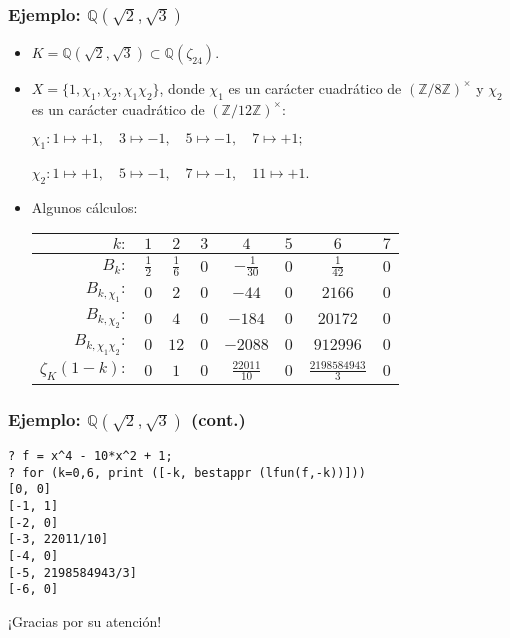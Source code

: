 \documentclass[handout]{beamer}
\newcommand{\ZZ}{\mathbb{Z}}
\newcommand{\QQ}{\mathbb{Q}}
\begin{document}

\begin{frame}
  \frametitle{Ejemplo: $\QQ (\sqrt{2},\sqrt{3})$}

  \begin{itemize}
  \item<1-> $K = \QQ (\sqrt{2},\sqrt{3}) \subset \QQ (\zeta_{24})$.

  \item<2-> $X = \{ 1, \chi_1, \chi_2, \chi_1\chi_2 \}$, donde $\chi_1$ es un carácter
    cuadrático de $(\ZZ/8\ZZ)^\times$ y $\chi_2$ es un carácter cuadrático de
    $(\ZZ/12\ZZ)^\times$:

    $\chi_1\colon 1 \mapsto +1, \quad
    3\mapsto -1, \quad
    5\mapsto -1, \quad
    7\mapsto +1;$

    $\chi_2\colon 1 \mapsto +1, \quad
    5\mapsto -1, \quad
    7\mapsto -1, \quad
    11\mapsto +1$.

  \item<3-> Algunos cálculos:

    \begin{center}\small
      \renewcommand{\arraystretch}{1.5}
    \begin{tabular}{rccccccc}
      \hline
      $k\colon$ & $1$ & $2$ & $3$ & $4$ & $5$ & $6$ & $7$ \\
      \hline
      $B_k\colon$ & $\frac{1}{2}$ & $\frac{1}{6}$ & $0$ & $-\frac{1}{30}$ & $0$ & $\frac{1}{42}$ & $0$ \\
      \hline
      $B_{k,\chi_1}\colon$ & $0$ & $2$ & $0$ & $-44$ & $0$ & $2166$ & $0$ \\
      \hline
      $B_{k,\chi_2}\colon$ & $0$ & $4$ & $0$ & $-184$ & $0$ & $20172$ & $0$ \\
      \hline
      $B_{k,\chi_1 \chi_2}\colon$ & $0$ & $12$ & $0$ & $-2088$ & $0$ & $912996$ & $0$ \\
      \hline
      $\zeta_K (1-k)\colon$ & $0$ & $1$ & $0$ & $\frac{22011}{10}$ & $0$ & $\frac{2198584943}{3}$ & $0$ \\
      \hline
    \end{tabular}
  \end{center}
  \end{itemize}
\end{frame}


\begin{frame}[fragile]
  \frametitle{Ejemplo: $\QQ (\sqrt{2},\sqrt{3})$ (cont.)}

  \begin{shaded}\small
\begin{verbatim}
? f = x^4 - 10*x^2 + 1;
? for (k=0,6, print ([-k, bestappr (lfun(f,-k))]))
[0, 0]
[-1, 1]
[-2, 0]
[-3, 22011/10]
[-4, 0]
[-5, 2198584943/3]
[-6, 0]
\end{verbatim}
\end{shaded}
\end{frame}


\begin{frame}[plain]
  \headingfont

  \begin{center}
    {\huge ¡Gracias por su atención!}
  \end{center}
\end{frame}
\end{document}
